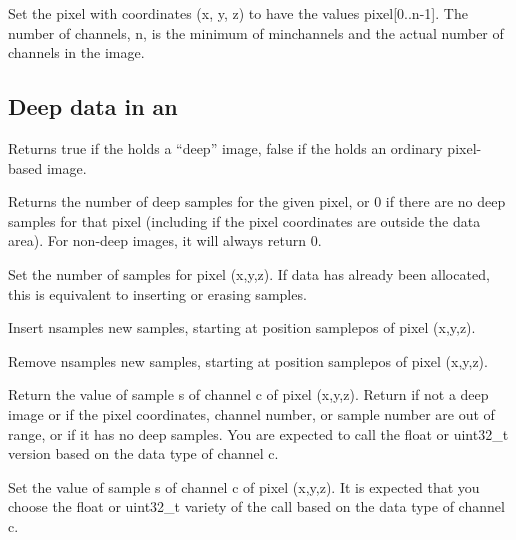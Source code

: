 Set the pixel with coordinates {\cf (x, y, z)} to have the values
{\cf pixel[0..n-1]}.  The number of channels, {\cf n}, is the minimum of
{\cf minchannels} and the actual number of channels in the image.
\apiend


\subsection*{Deep data in an \ImageBuf}

Returns {\cf true} if the \ImageBuf holds a ``deep'' image, {\cf false}
if the \ImageBuf holds an ordinary pixel-based image.
\apiend

Returns the number of deep samples for the given pixel, or 0 if there
are no deep samples for that pixel (including if the pixel coordinates
are outside the data area).  For non-deep images, it will always return 0.
\apiend

Set the number of samples for pixel {\cf (x,y,z)}. If data has already been
allocated, this is equivalent to inserting or erasing samples.
\apiend

Insert {\cf nsamples} new samples, starting at position {\cf samplepos} of
pixel {\cf (x,y,z)}.
\apiend

Remove {\cf nsamples} new samples, starting at position {\cf samplepos} of
pixel {\cf (x,y,z)}.
\apiend

Return the value of sample {\cf s} of channel {\cf c}
of pixel {\cf (x,y,z)}.  Return {} if not a deep image or if the
pixel coordinates, channel number, or sample number are out of range, or
if it has no deep samples.  You are expected to call the {\cf float} or
{\cf uint32_t} version based on the data type of channel {\cf c}.
\apiend

Set the value of sample {\cf s} of channel {\cf c}
of pixel {\cf (x,y,z)}. It is expected that you choose the {\cf float}
or {\cf uint32_t} variety of the call based on the data type of channel {\cf c}.
\apiend

